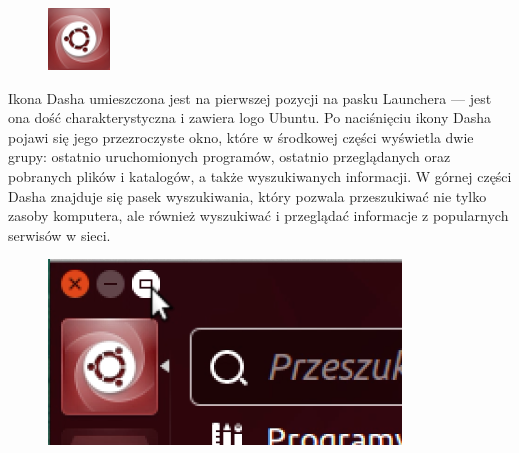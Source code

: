 \begin{figure}
	\vspace{-10pt}
	\includegraphics[width=\linewidth]{images/ikony_dash.png}
\end{figure}

Ikona Dasha umieszczona jest na pierwszej pozycji na pasku Launchera --- jest ona dość charakterystyczna i zawiera logo Ubuntu. Po naciśnięciu ikony Dasha pojawi się jego przezroczyste okno, które w środkowej części wyświetla dwie grupy: ostatnio uruchomionych programów, ostatnio przeglądanych oraz pobranych plików i katalogów, a także wyszukiwanych informacji. W górnej części Dasha znajduje się pasek wyszukiwania, który pozwala przeszukiwać nie tylko zasoby komputera, ale również wyszukiwać i przeglądać informacje z popularnych serwisów w sieci. 

\begin{figure}
                \includegraphics[width=\linewidth]{images/unity_dash_max.png}
\end{figure}


